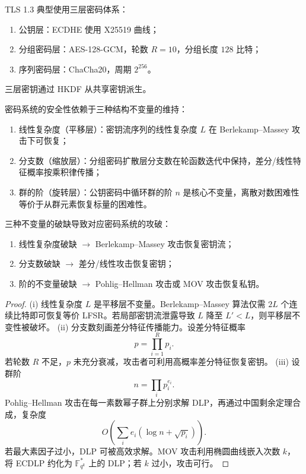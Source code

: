 \begin{example}\label{ex:tls_layers}
TLS 1.3 典型使用三层密码体系：
\begin{enumerate}[label=(\roman*)]
    \item 公钥层：ECDHE 使用 X25519 曲线；
    \item 分组密码层：AES-128-GCM，轮数 \(R=10\)，分组长度 \(128\) 比特；
    \item 序列密码层：ChaCha20，周期 \(2^{256}\)。
\end{enumerate}
三层密钥通过 HKDF 从共享密钥派生。
\end{example}

\begin{theorem}[密码系统的三种结构不变量]\label{thm:crypto_invariants}
密码系统的安全性依赖于三种结构不变量的维持：
\begin{enumerate}[label=(\roman*)]
    \item 线性复杂度（平移层）：密钥流序列的线性复杂度 \(L\) 在 Berlekamp--Massey 攻击下可恢复；
    \item 分支数（缩放层）：分组密码扩散层分支数在轮函数迭代中保持，差分/线性特征概率按乘积律传播；
    \item 群的阶（旋转层）：公钥密码中循环群的阶 \(n\) 是核心不变量，离散对数困难性等价于从群元素恢复标量的困难性。
\end{enumerate}
三种不变量的破缺导致对应密码系统的攻破：
\begin{enumerate}[label=(\roman*)]
    \item 线性复杂度破缺 \(\to\) Berlekamp--Massey 攻击恢复密钥流；
    \item 分支数破缺 \(\to\) 差分/线性攻击恢复密钥；
    \item 阶的不变量破缺 \(\to\) Pohlig--Hellman 攻击或 MOV 攻击恢复私钥。
\end{enumerate}
\end{theorem}

\begin{proof}
(i) 线性复杂度 \(L\) 是平移层不变量。Berlekamp--Massey 算法仅需 \(2L\) 个连续比特即可恢复等价 LFSR。若局部密钥流泄露导致 \(L\) 降至 \(L'<L\)，则平移层不变性被破坏。
(ii) 分支数刻画差分特征传播能力。设差分特征概率
\[
p=\prod_{i=1}^{R}p_i.
\]
若轮数 \(R\) 不足，\(p\) 未充分衰减，攻击者可利用高概率差分特征恢复密钥。
(iii) 设群阶
\[
n=\prod_i p_i^{e_i}.
\]
Pohlig--Hellman 攻击在每一素数幂子群上分别求解 DLP，再通过中国剩余定理合成，复杂度
\[
O\left(\sum_i e_i(\log n+\sqrt{p_i})\right).
\]
若最大素因子过小，DLP 可被高效求解。MOV 攻击利用椭圆曲线嵌入次数 \(k\)，将 ECDLP 约化为 \(\mathbb F_{q^k}^*\) 上的 DLP；若 \(k\) 过小，攻击可行。
\end{proof}

